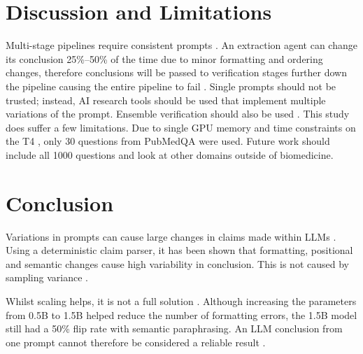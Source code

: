 \documentclass[10pt, conference, letterpaper]{IEEEtran}
\begin{document}
\section{Discussion and Limitations}
Multi-stage pipelines require consistent prompts \cite{wang2024survey, xi2023rise}. An extraction agent can change its conclusion 25\%--50\% of the time due to minor formatting and ordering changes, therefore conclusions will be passed to verification stages further down the pipeline causing the entire pipeline to fail \cite{mialon2023augmented, wu2023agentbench}. Single prompts should not be trusted; instead, AI research tools should be used that implement multiple variations of the prompt. Ensemble verification should also be used \cite{zhao2021calibrate}. This study does suffer a few limitations. Due to single GPU memory and time constraints on the T4 \cite{jin2019pubmedqa}, only 30 questions from PubMedQA were used. Future work should include all 1000 questions and look at other domains outside of biomedicine.

\section{Conclusion}
Variations in prompts can cause large changes in claims made within LLMs \cite{errica2025wrong, sclar2024quantifying}. Using a deterministic claim parser, it has been shown that formatting, positional and semantic changes cause high variability in conclusion. This is not caused by sampling variance \cite{wang2023self}.

Whilst scaling helps, it is not a full solution \cite{qwen2024}. Although increasing the parameters from 0.5B to 1.5B helped reduce the number of formatting errors, the 1.5B model still had a 50\% flip rate with semantic paraphrasing. An LLM conclusion from one prompt cannot therefore be considered a reliable result \cite{turpin2023language}.
\end{document}
